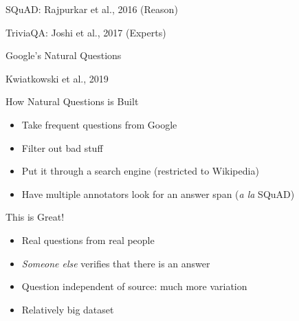 \documentclass[xcolor=dvipsnames]{beamer}
\newcommand{\fsi}[2]{
\begin{frame}[plain]
\vspace*{-1pt}
\makebox[\linewidth]{\texttt{[image: \#1]}}
\begin{center}
#2
\end{center}
\end{frame}
}
\newcommand{\gfxq}[2]{
\begin{center}
	\texttt{[image: qb/\#1]}
\end{center}
}
\begin{document}





\fsi{qb/squad}{SQuAD: Rajpurkar et al., 2016 (Reason)}

\fsi{qb/triviaqa}{TriviaQA: Joshi et al., 2017 (Experts)}


\begin{frame}{Google's Natural Questions}
  \only<1>{\gfxq{natural_questions}{1.0}}
  \only<2>{\gfxq{abraham}{1.0}}

  Kwiatkowski et al., 2019
\end{frame}

\begin{frame}{How Natural Questions is Built}
  \begin{itemize}
  \item Take frequent questions from Google
  \item Filter out bad stuff
  \item Put it through a search engine (restricted to Wikipedia)
    \item Have multiple annotators look for an answer span (\textit{a la} SQuAD)
  \end{itemize}
\end{frame}

\begin{frame}{This is Great!}
  \begin{itemize}
  \item Real questions from real people
  \item \emph{Someone else} verifies that there is an answer
  \item Question independent of source: much more variation
    \item Relatively big dataset
  \end{itemize}
\end{frame}

\fsi{qb/hcqa_ambigqa}{}
\end{document}
